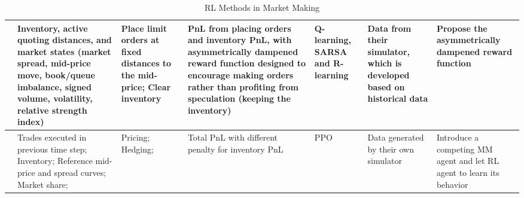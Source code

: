 \begin{table}
\begin{tabular}{ | m{2cm} | m{2.5cm}| m{2.5cm} | m{2.5cm} |m{1.7cm} |m{2cm} | m{2cm} | }
  
  \citet{Spooner2018MM} & Inventory, active quoting distances, and 
market states (market spread, mid-price move,
book/queue imbalance, signed volume, 
volatility, relative strength index) & Place limit orders at fixed distances to the mid-price; Clear inventory  &  PnL from placing orders and inventory PnL, with asymmetrically dampened reward function designed to encourage making orders rather than profiting from speculation (keeping the inventory) & Q-learning, 
SARSA 
and R-learning & Data from their simulator, which is developed based on historical data & Propose the asymmetrically dampened reward function\\
  \hline
  
  \citet{Ganesh2019MM} & Trades executed in previous time step; Inventory; Reference 
mid-price and spread curves; Market share; & Pricing; Hedging;  & Total PnL with different penalty for inventory PnL & PPO & Data generated by their own simulator & Introduce a competing MM agent and let RL agent to learn its behavior\\ 
  \hline
\end{tabular}




\caption{RL Methods in Market Making}
\label{table:market_making}
\end{table}

